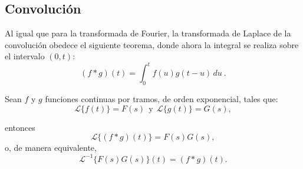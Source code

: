\subsection{Convolución}







Al igual que para la transformada de Fourier, la transformada de Laplace de la convolución obedece el siguiente teorema, donde ahora la integral se realiza sobre el intervalo $(0, t)$:
\begin{equation*}
    (f*g)(t) = \int_0^t f(u) g(t-u) \, du \ . 
\end{equation*}

\begin{teorema} \label{Teo:Convolucion}
    Sean $f$ y $g$ funciones continuas por tramos, de orden exponencial, tales que:
    \begin{equation*}
    \mathcal{L}\{f(t)\} = F(s) ~~\mbox{y}~~ \mathcal{L}\{g(t)\} = G(s),
    \end{equation*}

    entonces
    \begin{equation}
    \mathcal{L}\{(f*g)(t)\} = F(s)G(s),
    \end{equation}
    o, de manera equivalente,
    \begin{equation}
    \mathcal{L}^{-1}\{F(s)G(s)\}(t) = (f*g)(t).
    \end{equation}    
\end{teorema}


